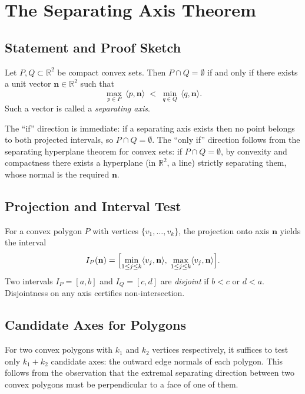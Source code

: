 \section{The Separating Axis Theorem}
\label{sec:sat}

\subsection{Statement and Proof Sketch}

\begin{theorem}
Let $P, Q \subset \mathbb{R}^2$ be compact convex sets.
Then $P \cap Q = \emptyset$ if and only if there exists a unit vector
$\mathbf{n} \in \mathbb{R}^2$ such that
\[
  \max_{p \in P}\, \langle p, \mathbf{n} \rangle
  \;<\;
  \min_{q \in Q}\, \langle q, \mathbf{n} \rangle.
\]
Such a vector is called a \emph{separating axis}.
\end{theorem}

The ``if'' direction is immediate: if a separating axis exists then no
point belongs to both projected intervals, so $P \cap Q = \emptyset$.
The ``only if'' direction follows from the separating hyperplane theorem
for convex sets: if $P \cap Q = \emptyset$, by convexity and compactness
there exists a hyperplane (in $\mathbb{R}^2$, a line) strictly separating
them, whose normal is the required $\mathbf{n}$.

\subsection{Projection and Interval Test}

For a convex polygon $P$ with vertices $\{v_1, \dots, v_k\}$, the
projection onto axis $\mathbf{n}$ yields the interval
\[
  I_P(\mathbf{n}) = \Bigl[
    \min_{1 \le j \le k} \langle v_j, \mathbf{n} \rangle,\;
    \max_{1 \le j \le k} \langle v_j, \mathbf{n} \rangle
  \Bigr].
\]
Two intervals $I_P = [a, b]$ and $I_Q = [c, d]$ are \emph{disjoint}
if $b < c$ or $d < a$. Disjointness on any axis certifies non-intersection.

\subsection{Candidate Axes for Polygons}

For two convex polygons with $k_1$ and $k_2$ vertices respectively,
it suffices to test only $k_1 + k_2$ candidate axes: the outward edge
normals of each polygon. This follows from the observation that the
extremal separating direction between two convex polygons must be
perpendicular to a face of one of them.

